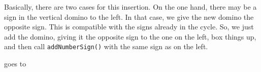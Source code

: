\documentclass[12pt]{article}
\numberwithin{equation}{section}
\newcommand{\horizontalDominoRS}[3]{\filldraw [dominoRSStyle] (#2 - 1 + \eps, #1 - 1 + \eps) rectangle + (2 - \teps, 1 -\teps) node [dominoText] {$#3$};}
\newcommand{\verticalDominoRSShift}[4]{\filldraw [dominoRSStyle] (#2 - 1 + #4 + \eps,  #1 - 1 + \eps) rectangle + (1 - \teps,2 -\teps) node [dominoText] {$#3$};}
\begin{document}
\begin{itemize}
\begin{itemize}
      Basically, there are two cases for this insertion.
      On the one hand, there may be a sign in the vertical domino to the left.
      In that case, we give the new domino the opposite sign.
      This is compatible with the signs already in
      the cycle.
      So, we just add the domino, giving it the opposite sign to the one on the left, box things up, and then call \texttt{addNumberSign()} with the same sign as on the left.
      \begin{figure}[H]
        \centering
      \end{figure}
      goes to
      \begin{figure}[H]
        \centering
\end{figure}
\end{itemize}
\end{itemize}
\end{document}
